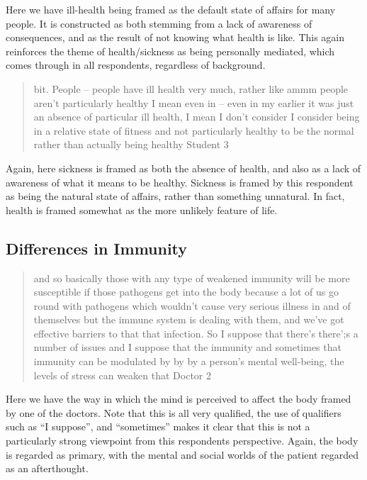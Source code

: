 Here we have ill-health being framed as the default state of affairs for many people. It is constructed as both stemming from a lack of awareness of consequences, and as the result of not knowing what health is like. This again reinforces the theme of health/sickness as being personally mediated, which comes through in all respondents, regardless of background. 

\begin{quotation}
  bit. People – people have ill health very much, rather like ammm people aren't particularly healthy I mean even in – even in my earlier it was just an absence of particular ill health, I mean I don't consider I consider being in a relative state of fitness and not particularly healthy to be the normal rather than actually being healthy 
Student 3
\end{quotation}

Again, here sickness is framed as both the absence of health, and also as a lack of awareness of what it means to be healthy. Sickness is framed by this respondent as being the natural state of affairs, rather than something unnatural. In fact, health is framed somewhat as the more unlikely feature of life. 

\subsection{Differences in Immunity}
\label{sec:differences-immunity}

\begin{quotation}
  and so basically those with any type of weakened immunity will be more susceptible if those pathogens get into the body because a lot of us go round with pathogens which wouldn't cause very serious illness in and of themselves but the immune system is dealing with them, and we've got effective barriers to that that infection. So I suppose that there's there';s a number of issues and I suppose that the immunity and sometimes that immunity can be modulated  by by by a person's mental well-being, the levels of stress can weaken that 
Doctor 2
\end{quotation}

Here we have the way in which the mind is perceived to affect the body framed by one of the doctors. Note that this is all very qualified, the use of qualifiers such as ``I suppose'', and ``sometimes'' makes it clear that this is not a particularly strong viewpoint from this respondents perspective. Again, the body is regarded as primary, with the mental and social worlds of the patient regarded as an afterthought. 


